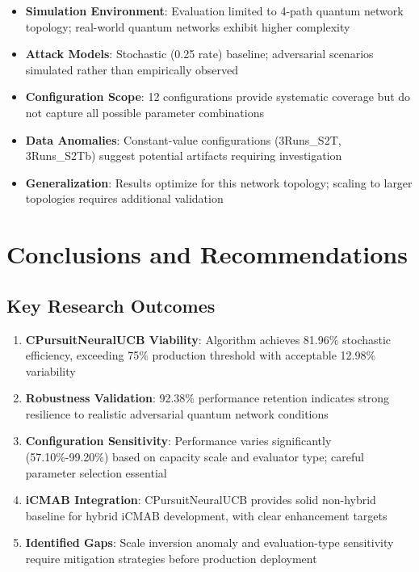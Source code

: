 \documentclass[12pt,a4paper]{article}
\newcommand{\primarytext}[1]{\textcolor{primaryblue}{\textbf{#1}}}
\newcommand{\secondarytext}[1]{\textcolor{secondaryblue}{\textbf{#1}}}
\newcommand{\success}[1]{\textcolor{accentgreen}{\textbf{#1}}}
\newcommand{\warning}[1]{\textcolor{warningred}{\textbf{#1}}}
\begin{document}
\begin{itemize}
\item \primarytext{Simulation Environment}: Evaluation limited to 4-path quantum network topology; real-world quantum networks exhibit higher complexity
\item \secondarytext{Attack Models}: Stochastic (0.25 rate) baseline; adversarial scenarios simulated rather than empirically observed
\item \primarytext{Configuration Scope}: 12 configurations provide systematic coverage but do not capture all possible parameter combinations
\item \warning{Data Anomalies}: Constant-value configurations (3Runs\_S2T, 3Runs\_S2Tb) suggest potential artifacts requiring investigation
\item \success{Generalization}: Results optimize for this network topology; scaling to larger topologies requires additional validation
\end{itemize}

\section{Conclusions and Recommendations}

\subsection{Key Research Outcomes}

\begin{enumerate}
\item \primarytext{CPursuitNeuralUCB Viability}: Algorithm achieves 81.96\% stochastic efficiency, exceeding 75\% production threshold with acceptable 12.98\% variability
\item \success{Robustness Validation}: 92.38\% performance retention indicates strong resilience to realistic adversarial quantum network conditions
\item \secondarytext{Configuration Sensitivity}: Performance varies significantly (57.10\%-99.20\%) based on capacity scale and evaluator type; careful parameter selection essential
\item \primarytext{iCMAB Integration}: CPursuitNeuralUCB provides solid non-hybrid baseline for hybrid iCMAB development, with clear enhancement targets
\item \warning{Identified Gaps}: Scale inversion anomaly and evaluation-type sensitivity require mitigation strategies before production deployment
\end{enumerate}
\end{document}
